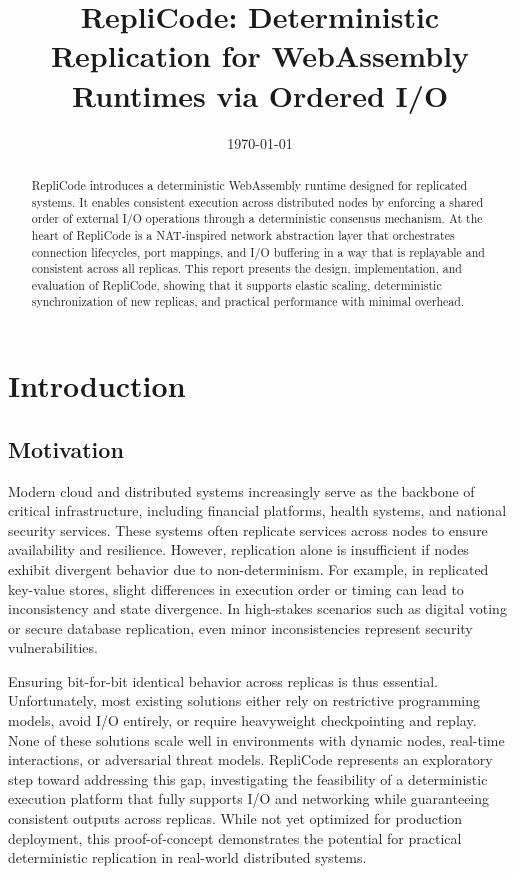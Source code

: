 \documentclass[10pt, 
]{IEEEtran}
\title{RepliCode: Deterministic Replication for WebAssembly Runtimes via Ordered I/O}
\author{
    \IEEEauthorblockN{Ricardo Perelló Mas \\}
    \IEEEauthorblockA{
        Distributed Computing Lab, EPFL \\
        ricardo.perellomas@epfl.ch \\
        Spring 2025
    }
}
\date{\today}
\begin{document}
\maketitle

\begin{abstract}
RepliCode introduces a deterministic WebAssembly runtime designed for replicated systems. It enables consistent execution across distributed nodes by enforcing a shared order of external I/O operations through a deterministic consensus mechanism. At the heart of RepliCode is a NAT-inspired network abstraction layer that orchestrates connection lifecycles, port mappings, and I/O buffering in a way that is replayable and consistent across all replicas. This report presents the design, implementation, and evaluation of RepliCode, showing that it supports elastic scaling, deterministic synchronization of new replicas, and practical performance with minimal overhead.
\end{abstract}

\section{Introduction}

\subsection{Motivation}
Modern cloud and distributed systems increasingly serve as the backbone of critical infrastructure, including financial platforms, health systems, and national security services. These systems often replicate services across nodes to ensure availability and resilience. However, replication alone is insufficient if nodes exhibit divergent behavior due to non-determinism. For example, in replicated key-value stores, slight differences in execution order or timing can lead to inconsistency and state divergence. In high-stakes scenarios such as digital voting or secure database replication, even minor inconsistencies represent security vulnerabilities.

Ensuring bit-for-bit identical behavior across replicas is thus essential. Unfortunately, most existing solutions either rely on restrictive programming models, avoid I/O entirely, or require heavyweight checkpointing and replay. None of these solutions scale well in environments with dynamic nodes, real-time interactions, or adversarial threat models. RepliCode represents an exploratory step toward addressing this gap, investigating the feasibility of a deterministic execution platform that fully supports I/O and networking while guaranteeing consistent outputs across replicas. While not yet optimized for production deployment, this proof-of-concept demonstrates the potential for practical deterministic replication in real-world distributed systems.
\end{document}
